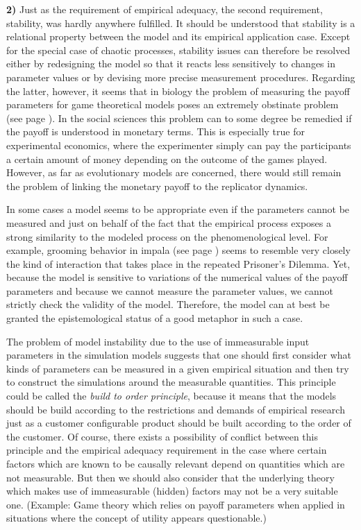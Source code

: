 {\bf 2)} Just as the requirement of empirical adequacy, the second
requirement, stability, was hardly anywhere fulfilled. It should be understood
that stability is a relational property between the model and its empirical
application case. Except for the special case of chaotic processes, stability
issues can therefore be resolved either by redesigning the model so that it
reacts less sensitively to changes in parameter values or by devising more
precise measurement procedures. Regarding the latter, however, it seems that
in biology the problem of measuring the payoff parameters for game theoretical
models poses an extremely obstinate problem (see page \pageref{bluejays}). In
the social sciences this problem can to some degree be remedied if the payoff
is understood in monetary terms. This is especially true for experimental
economics, where the experimenter simply can pay the participants a certain
amount of money depending on the outcome of the games played. However, as far
as evolutionary models are concerned, there would still remain the problem of
linking the monetary payoff to the replicator dynamics.

In some cases a model seems to be appropriate even if the parameters cannot be
measured and just on behalf of the fact that the empirical process exposes a
strong similarity to the modeled process on the phenomenological level. For
example, grooming behavior in impala (see page \pageref{impalaGrooming}) seems
to resemble very closely the kind of interaction that takes place in the
repeated Prisoner's Dilemma. Yet, because the model is sensitive to variations
of the numerical values of the payoff parameters and because we cannot measure
the parameter values, we cannot strictly check the validity of the model.
Therefore, the model can at best be granted the epistemological status of a
good metaphor in such a case.

The problem of model instability due to the use of immeasurable input
parameters in the simulation models suggests that one should first consider
what kinds of parameters can be measured in a given empirical situation and
then try to construct the simulations around the measurable quantities. This
principle could be called the {\em build to order principle}, because it
means that the models should be build according to the restrictions and
demands of empirical research just as a customer configurable product should
be built according to the order of the customer. Of course, there exists a
possibility of conflict between this principle and the empirical adequacy
requirement in the case where certain factors which are known to be causally
relevant depend on quantities which are not measurable. But then we should
also consider that the underlying theory which makes use of immeasurable 
(hidden) factors may not be a very suitable one. (Example: Game theory which
relies on payoff parameters when applied in situations where the concept of
utility appears questionable.)


